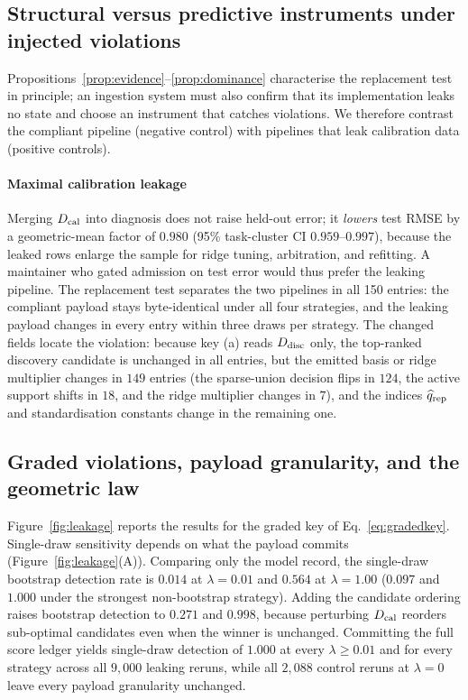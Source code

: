 \subsection{Structural versus predictive instruments under injected violations}\label{sec:leakresults}

Propositions~\ref{prop:evidence}--\ref{prop:dominance} characterise the replacement test in principle; an ingestion system must also confirm that its implementation leaks no state and choose an instrument that catches violations. We therefore contrast the compliant pipeline (negative control) with pipelines that leak calibration data (positive controls).

\paragraph{Maximal calibration leakage} Merging \(D_{\rm cal}\) into diagnosis does not raise held-out error; it \emph{lowers} test RMSE by a geometric-mean factor of \(0.980\) (95\% task-cluster CI \(0.959\)--\(0.997\)), because the leaked rows enlarge the sample for ridge tuning, arbitration, and refitting. A maintainer who gated admission on test error would thus prefer the leaking pipeline. The replacement test separates the two pipelines in all 150 entries: the compliant payload stays byte-identical under all four strategies, and the leaking payload changes in every entry within three draws per strategy. The changed fields locate the violation: because key (a) reads \(D_{\rm disc}\) only, the top-ranked discovery candidate is unchanged in all entries, but the emitted basis or ridge multiplier changes in \(149\) entries (the sparse-union decision flips in \(124\), the active support shifts in \(18\), and the ridge multiplier changes in \(7\)), and the indices \(\widehat q_{\rm rep}\) and standardisation constants change in the remaining one.

\subsection{Graded violations, payload granularity, and the geometric law}\label{sec:gradedleak}

Figure~\ref{fig:leakage} reports the results for the graded key of Eq.~\eqref{eq:gradedkey}. Single-draw sensitivity depends on what the payload commits (Figure~\ref{fig:leakage}(A)). Comparing only the model record, the single-draw bootstrap detection rate is \(0.014\) at \(\lambda=0.01\) and \(0.564\) at \(\lambda=1.00\) (\(0.097\) and \(1.000\) under the strongest non-bootstrap strategy). Adding the candidate ordering raises bootstrap detection to \(0.271\) and \(0.998\), because perturbing \(D_{\rm cal}\) reorders sub-optimal candidates even when the winner is unchanged. Committing the full score ledger yields single-draw detection of \(1.000\) at every \(\lambda\ge0.01\) and for every strategy across all \(9{,}000\) leaking reruns, while all \(2{,}088\) control reruns at \(\lambda=0\) leave every payload granularity unchanged.

